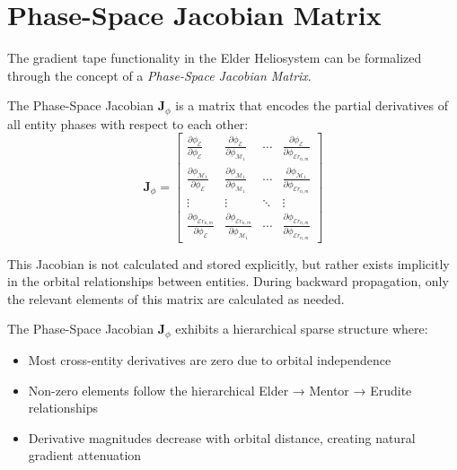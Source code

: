 \section{Phase-Space Jacobian Matrix}

The gradient tape functionality in the Elder Heliosystem can be formalized through the concept of a \textit{Phase-Space Jacobian Matrix}.

\begin{definition}
The Phase-Space Jacobian $\mathbf{J}_{\phi}$ is a matrix that encodes the partial derivatives of all entity phases with respect to each other:
\begin{equation}
\mathbf{J}_{\phi} = 
\begin{bmatrix}
\frac{\partial \phi_{\mathcal{E}}}{\partial \phi_{\mathcal{E}}} & \frac{\partial \phi_{\mathcal{E}}}{\partial \phi_{\mathcal{M}_1}} & \cdots & \frac{\partial \phi_{\mathcal{E}}}{\partial \phi_{\mathcal{E}r_{n,m}}} \\
\frac{\partial \phi_{\mathcal{M}_1}}{\partial \phi_{\mathcal{E}}} & \frac{\partial \phi_{\mathcal{M}_1}}{\partial \phi_{\mathcal{M}_1}} & \cdots & \frac{\partial \phi_{\mathcal{M}_1}}{\partial \phi_{\mathcal{E}r_{n,m}}} \\
\vdots & \vdots & \ddots & \vdots \\
\frac{\partial \phi_{\mathcal{E}r_{n,m}}}{\partial \phi_{\mathcal{E}}} & \frac{\partial \phi_{\mathcal{E}r_{n,m}}}{\partial \phi_{\mathcal{M}_1}} & \cdots & \frac{\partial \phi_{\mathcal{E}r_{n,m}}}{\partial \phi_{\mathcal{E}r_{n,m}}}
\end{bmatrix}
\end{equation}
\end{definition}

This Jacobian is not calculated and stored explicitly, but rather exists implicitly in the orbital relationships between entities. During backward propagation, only the relevant elements of this matrix are calculated as needed.

\begin{proposition}
The Phase-Space Jacobian $\mathbf{J}_{\phi}$ exhibits a hierarchical sparse structure where:
\begin{itemize}
    \item Most cross-entity derivatives are zero due to orbital independence
    \item Non-zero elements follow the hierarchical Elder → Mentor → Erudite relationships
    \item Derivative magnitudes decrease with orbital distance, creating natural gradient attenuation
\end{itemize}
\end{proposition}

